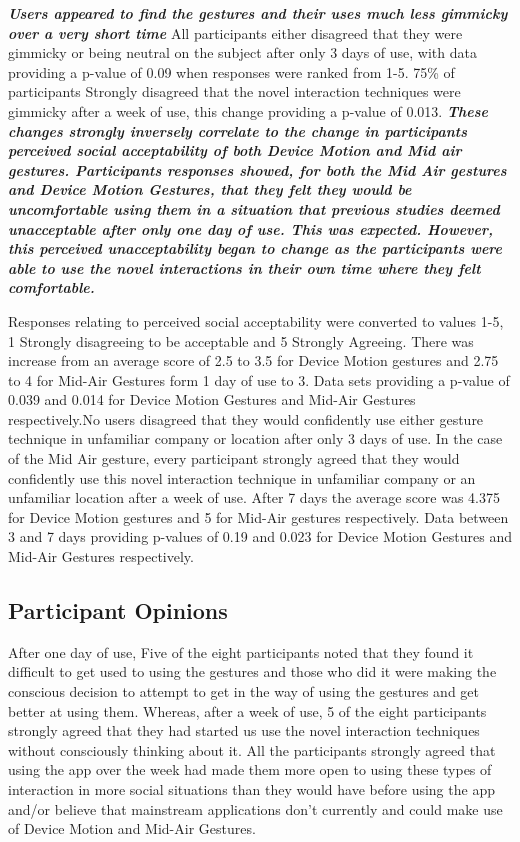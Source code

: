 \documentclass{l4proj}
\begin{document}
\textbf{\textit{Users appeared to find the gestures and their uses much less gimmicky over a very short time}} All participants either disagreed that they were gimmicky or being neutral on the subject after only 3 days of use, with data providing a p-value of 0.09 when responses were ranked from 1-5. 75\% of participants Strongly disagreed that the novel interaction techniques were gimmicky after a week of use, this change providing a p-value of 0.013. \textbf{\textit{These changes strongly inversely correlate to the change in participants perceived social acceptability of both Device Motion and Mid air gestures. Participants responses showed, for both the Mid Air gestures and Device Motion Gestures, that they felt they would be uncomfortable using them in a situation that previous studies deemed unacceptable after only one day of use. This was expected. However, this perceived unacceptability began to change as the participants were able to use the novel interactions in their own time where they felt comfortable.}} 

Responses relating to perceived social acceptability were converted to values 1-5, 1 Strongly disagreeing to be acceptable and 5 Strongly Agreeing. There was increase from an average score of 2.5 to 3.5 for Device Motion gestures and 2.75 to 4 for Mid-Air Gestures form 1 day of use to 3. Data sets providing a p-value of 0.039 and 0.014 for Device Motion Gestures and Mid-Air Gestures respectively.No users disagreed that they would confidently use either gesture technique in unfamiliar company or location after only 3 days of use.  In the case of the Mid Air gesture, every participant strongly agreed that they would confidently use this novel interaction technique in unfamiliar company or an unfamiliar location after a week of use. After 7 days the average score was 4.375 for Device Motion gestures and 5 for Mid-Air gestures respectively. Data between 3 and 7 days providing p-values of 0.19 and 0.023 for Device Motion Gestures and Mid-Air Gestures respectively.


\subsection{Participant Opinions}
After one day of use, Five of the eight participants noted that they found it difficult to get used to using the gestures and those who did it were making the conscious decision to attempt to get in the way of using the gestures and get better at using them. Whereas, after a week of use, 5 of the eight participants strongly agreed that they had started us use the novel interaction techniques without consciously thinking about it. All the participants strongly agreed that using the app over the week had made them more open to using these types of interaction in more social situations than they would have before using the app and/or believe that mainstream applications don't currently and could make use of Device Motion and Mid-Air Gestures.
\end{document}
